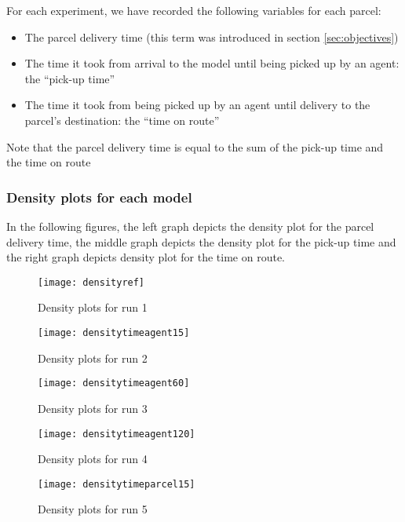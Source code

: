 For each experiment, we have recorded the following variables for each parcel:

\begin{itemize}
    \item The parcel delivery time (this term was introduced in section \ref{sec:objectives})
    \item The time it took from arrival to the model until being picked up by an agent: the ``pick-up time''
    \item The time it took from being picked up by an agent until delivery to the parcel's destination: the ``time on route''
\end{itemize}

Note that the parcel delivery time is equal to the sum of the pick-up time and the time on route

\subsubsection{Density plots for each model}
In the following figures, the left graph depicts the density plot for the parcel delivery time, the middle graph depicts the density plot for the pick-up time and the right graph depicts density plot for the time on route.

\begin{figure}[H]
    \centering
    \texttt{[image: densityref]}
    \caption{Density plots for run 1}
    \label{fig:densityref}
\end{figure}

\begin{figure}[H]
    \centering
    \texttt{[image: densitytimeagent15]}
    \caption{Density plots for run 2}
    \label{fig:densitytimeagent15}
\end{figure}

\begin{figure}[H]
    \centering
    \texttt{[image: densitytimeagent60]}
    \caption{Density plots for run 3}
    \label{fig:densitytimeagent60}
\end{figure}

\begin{figure}[H]
    \centering
    \texttt{[image: densitytimeagent120]}
    \caption{Density plots for run 4}
    \label{dfig:densitytimeagent120}
\end{figure}

\begin{figure}[H]
    \centering
    \texttt{[image: densitytimeparcel15]}
    \caption{Density plots for run 5}
    \label{fig:densitytimeparcel15}
\end{figure}

